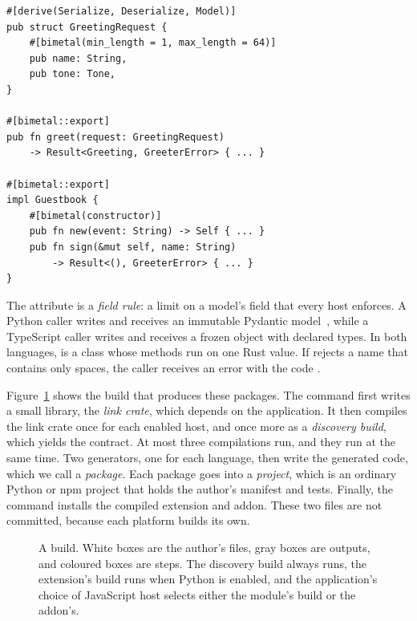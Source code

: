 \documentclass[sigconf,nonacm]{acmart}
\begin{document}
\begin{footnotesize}
\begin{verbatim}
#[derive(Serialize, Deserialize, Model)]
pub struct GreetingRequest {
    #[bimetal(min_length = 1, max_length = 64)]
    pub name: String,
    pub tone: Tone,
}

#[bimetal::export]
pub fn greet(request: GreetingRequest)
    -> Result<Greeting, GreeterError> { ... }

#[bimetal::export]
impl Guestbook {
    #[bimetal(constructor)]
    pub fn new(event: String) -> Self { ... }
    pub fn sign(&mut self, name: String)
        -> Result<(), GreeterError> { ... }
}
\end{verbatim}
\end{footnotesize}

\begin{sloppypar}
The attribute  is a \emph{field rule}: a limit on a model's field that every host enforces. A Python caller writes  and receives an immutable Pydantic model~\cite{pydantic}, while a TypeScript caller writes  and receives a frozen object with declared types. In both languages,  is a class whose methods run on one Rust value. If  rejects a name that contains only spaces, the caller receives an error with the code .
\end{sloppypar}

Figure~\ref{fig:pipeline} shows the build that produces these packages. The command  first writes a small library, the \emph{link crate}, which depends on the application. It then compiles the link crate once for each enabled host, and once more as a \emph{discovery build}, which yields the contract. At most three compilations run, and they run at the same time. Two generators, one for each language, then write the generated code, which we call a \emph{package}. Each package goes into a \emph{project}, which is an ordinary Python or npm project that holds the author's manifest and tests. Finally, the command installs the compiled extension and addon. These two files are not committed, because each platform builds its own.

\begin{figure}[t]
\centering

\caption{A build. White boxes are the author's files, gray boxes are outputs, and coloured boxes are steps. The discovery build always runs, the extension's build runs when Python is enabled, and the application's choice of JavaScript host selects either the module's build or the addon's.}
\label{fig:pipeline}
\end{figure}
\end{document}
